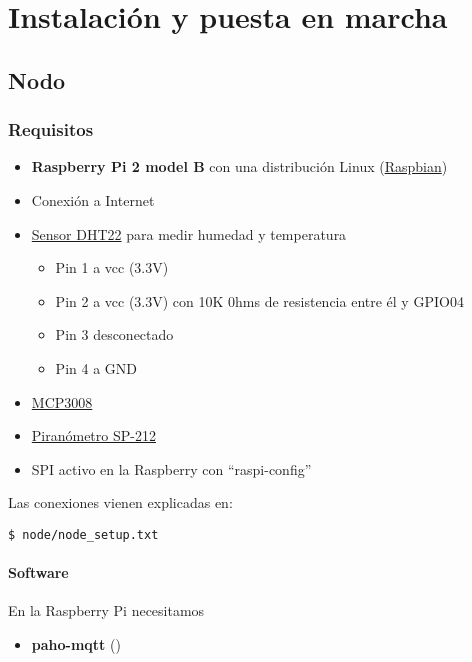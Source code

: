 \cleardoublepage

\chapter{Instalación y puesta en marcha}
\label{makereference5}

\section{Nodo}
\label{makereference5.1}
\subsection{Requisitos}
\label{makereference5.1.2}
	\begin{itemize}
		\item \textbf{Raspberry Pi 2 model B} con una distribución Linux (\href{https://www.raspberrypi.org/downloads/raspbian/}{Raspbian})
		\item Conexión a Internet
		\item \href{https://www.adafruit.com/product/385}{Sensor DHT22} para medir humedad y temperatura
			\begin{itemize}
				\item Pin 1 a vcc (3.3V)
				\item Pin 2 a vcc (3.3V) con 10K 0hms de resistencia entre él y GPIO04
				\item Pin 3 desconectado
				\item Pin 4 a GND
			\end{itemize}
		\item \href{https://www.adafruit.com/product/856}{MCP3008}
		\item \href{https://www.apogeeinstruments.co.uk/content/SP-212-215-manual.pdf}{Piranómetro SP-212}
		\item SPI activo en la Raspberry con ``raspi-config''
	\end{itemize}

Las conexiones vienen explicadas en:
\lstset{language=bash}
\begin{lstlisting}[frame=single]
$ node/node_setup.txt
\end{lstlisting}

\subsubsection{Software}
	En la Raspberry Pi necesitamos
	\begin{itemize}
		\item \textbf{paho-mqtt} (\cite{ARP:Paho:2017})
	\end{itemize}

